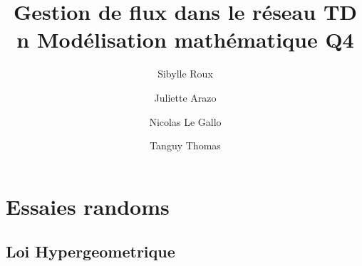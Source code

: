 \documentclass{article}
\begin{document}
\title{Gestion de flux dans le réseau
	\smallbreak
	TD n
	\smallbreak
	Modélisation mathématique
	\smallbreak
	Q4}
\author{Sibylle Roux \and Juliette Arazo \and Nicolas Le Gallo \and Tanguy Thomas}

\maketitle

\newpage

\tableofcontents

\newpage

\section{Essaies randoms}

\subsection{Loi Hypergeometrique}
\end{document}

